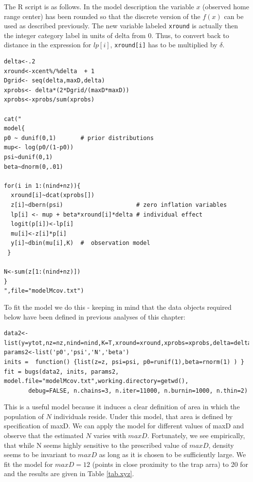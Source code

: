 The R script is as follows. In the model description the variable $x$ (observed home range center) has been rounded so that the discrete version of the $f(x)$ can be used as described previously. The new variable labeled \mbox{\tt xround} is actually then the integer category label in units of delta from 0. Thus, to convert back to distance in the expression for $lp[i]$, \mbox{\tt xround[i]} has to be multiplied by $\delta$.

\begin{verbatim}
delta<-.2
xround<-xcent%/%delta  + 1
Dgrid<- seq(delta,maxD,delta)
xprobs<- delta*(2*Dgrid/(maxD*maxD))
xprobs<-xprobs/sum(xprobs)

cat("
model{
p0 ~ dunif(0,1)       # prior distributions
mup<- log(p0/(1-p0))
psi~dunif(0,1)
beta~dnorm(0,.01)

for(i in 1:(nind+nz)){
  xround[i]~dcat(xprobs[])
  z[i]~dbern(psi)                     # zero inflation variables
  lp[i] <- mup + beta*xround[i]*delta # individual effect
  logit(p[i])<-lp[i]
  mu[i]<-z[i]*p[i]
  y[i]~dbin(mu[i],K)  #  observation model
 }

N<-sum(z[1:(nind+nz)])
}
",file="modelMcov.txt")
\end{verbatim}

To fit the model we do this - keeping in mind that the data objects required below have been defined in previous analyses of this chapter:

\begin{verbatim}
data2<-list(y=ytot,nz=nz,nind=nind,K=T,xround=xround,xprobs=xprobs,delta=delta)
params2<-list('p0','psi','N','beta')
inits =  function() {list(z=z, psi=psi, p0=runif(1),beta=rnorm(1) ) }
fit = bugs(data2, inits, params2, model.file="modelMcov.txt",working.directory=getwd(),    
       debug=FALSE, n.chains=3, n.iter=11000, n.burnin=1000, n.thin=2)
\end{verbatim}

This is a useful model because it induces a clear definition of area in which the population of $N$ individuals reside. Under this model, that area is defined  by specification of maxD. We can apply the model for different values of maxD and observe that the estimated $N$ varies with $maxD$. Fortunately, we see empirically, that while N seems highly sensitive to the prescribed value of $maxD$, density seems to be invariant to $maxD$ as long as it is chosen to be sufficiently large. We fit the model for $maxD=12$ (points in close proximity to the trap arra)  to 20 for and the results are given in Table \ref{tab.xyz}.

